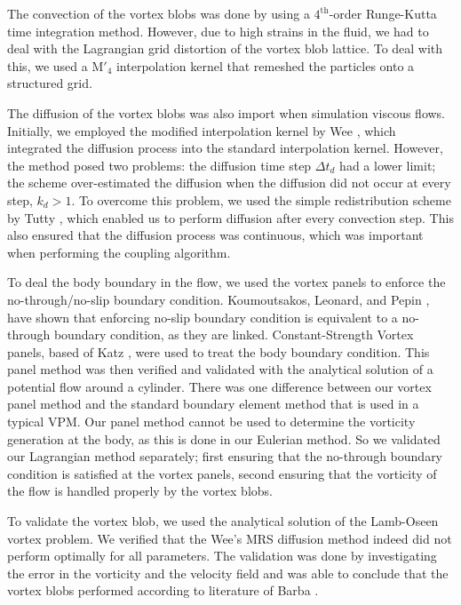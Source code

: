 The convection of the vortex blobs was done by using a $4^{\mathrm{th}}$-order Runge-Kutta time integration method. However, due to high strains in the fluid, we had to deal with the Lagrangian grid distortion of the vortex blob lattice. To deal with this, we used a $\mathrm{M}'_4$ interpolation kernel that remeshed the particles onto a structured grid.

The diffusion of the vortex blobs was also import when simulation viscous flows. Initially, we employed the modified interpolation kernel by Wee \cite{Wee2006a}, which integrated the diffusion process into the standard interpolation kernel. However, the method posed two problems: the diffusion time step $\Delta t_d$ had a lower limit; the scheme over-estimated the diffusion when the diffusion did not occur at every step, $k_d > 1$. To overcome this problem, we used the simple redistribution scheme by Tutty \cite{Tutty2010a}, which enabled us to perform diffusion after every convection step. This also ensured that the diffusion process was continuous, which was important when performing the coupling algorithm.

To deal the body boundary in the flow, we used the vortex panels to enforce the no-through/no-slip boundary condition. Koumoutsakos, Leonard, and Pepin \cite{Koumoutsakos1994b}, have shown that enforcing no-slip boundary condition is equivalent to a no-through boundary condition, as they are linked. Constant-Strength Vortex panels, based of Katz \cite{Katz2001a}, were used to treat the body boundary condition. This panel method was then verified and validated with the analytical solution of a potential flow around a cylinder. There was one difference between our vortex panel method and the standard boundary element method that is used in a typical VPM. Our panel method cannot be used to determine the vorticity generation at the body, as this is done in our Eulerian method. So we validated our Lagrangian method separately; first ensuring that the no-through boundary condition is satisfied at the vortex panels, second ensuring that the vorticity of the flow is handled properly by the vortex blobs.

To validate the vortex blob, we used the analytical solution of the Lamb-Oseen vortex problem. We verified that the Wee's MRS diffusion method indeed did not perform optimally for all parameters. The validation was done by investigating the error in the vorticity and the velocity field and was able to conclude that the vortex blobs performed according to literature of Barba \cite{Barba2004c}.

